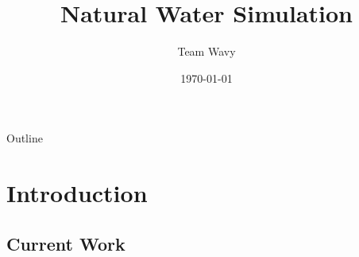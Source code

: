 \documentclass{beamer}
\title{Natural Water Simulation}
\author{Team Wavy}
\institute{School of Data and Computer Science(SYSU)}
\date{\today}
\begin{document}

\frame{\titlepage}

\section[Outline]{}
\begin{frame}{Outline}
  \tableofcontents
\end{frame}

\section{Introduction}
\subsection{Current Work}
\end{document}
